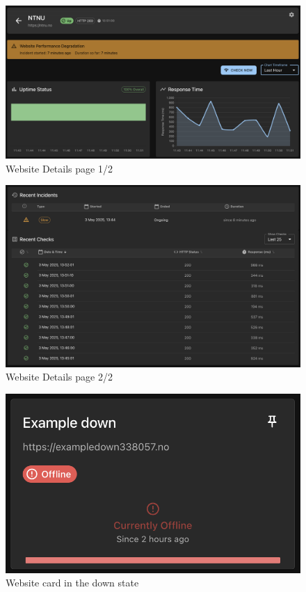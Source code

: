 \begin{figure}
    \centering
    \includegraphics[width=1\linewidth]{figures/websiteDetails.png}
    \caption{Website Details page 1/2}
    \label{fig:app_top_websitedetails}
\end{figure}

\begin{figure}
    \centering
    \includegraphics[width=1\linewidth]{figures/websiteDetails_bottom.png}
    \caption{Website Details page 2/2}
    \label{fig:app_bot_websitedetails}
\end{figure}

\begin{figure}
    \centering
    \includegraphics[width=1\linewidth]{figures/websitecard_down.png}
    \caption{Website card in the down state}
    \label{fig:app_down_websitecard}
\end{figure}

